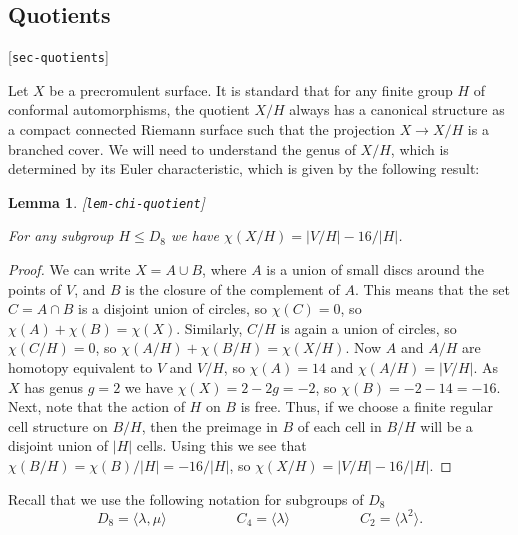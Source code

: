 \documentclass[reqno]{amsart}
\newcommand{\lbl}[1]{\label{#1}\textup{[\texttt{#1}]}\par}
\newcommand{\lbl}{\label}
\newcommand{\lm}        {\lambda}
\newcommand{\ip}[1]     {\langle #1\rangle}
\renewcommand{\:}{\colon}
\newtheorem{lemma}[theorem]{Lemma}
\theoremstyle{definition}
\begin{document}
\subsection{Quotients}
\lbl{sec-quotients}

Let $X$ be a precromulent surface.  It is standard that for any finite
group $H$ of conformal automorphisms, the quotient $X/H$ always has a
canonical structure as a compact connected Riemann surface such that
the projection $X\to X/H$ is a branched cover.  We will need to
understand the genus of $X/H$, which is determined by its Euler
characteristic, which is given by the following result:

\begin{lemma}\lbl{lem-chi-quotient}
 For any subgroup $H\leq D_8$ we have $\chi(X/H)=|V/H|-16/|H|$.
\end{lemma}
\begin{proof}
 We can write $X=A\cup B$, where $A$ is a union of small discs
 around the points of $V$, and $B$ is the closure of the complement of
 $A$.  This means that the set $C=A\cap B$ is a disjoint union of
 circles, so $\chi(C)=0$, so $\chi(A)+\chi(B)=\chi(X)$.  Similarly,
 $C/H$ is again a union of circles, so $\chi(C/H)=0$, so
 $\chi(A/H)+\chi(B/H)=\chi(X/H)$.  Now $A$ and $A/H$ are homotopy
 equivalent to $V$ and $V/H$, so $\chi(A)=14$ and $\chi(A/H)=|V/H|$.
 As $X$ has genus $g=2$ we have $\chi(X)=2-2g=-2$, so
 $\chi(B)=-2-14=-16$.  Next, note that the action of $H$ on $B$ is
 free.  Thus, if we choose a finite regular cell
 structure on $B/H$, then the preimage in $B$ of each cell in $B/H$
 will be a disjoint union of $|H|$ cells.  Using this we see that
 $\chi(B/H)=\chi(B)/|H|=-16/|H|$, so $\chi(X/H)=|V/H|-16/|H|$.
\end{proof}

Recall that we use the following notation for subgroups of $D_8$
\[
  D_8 = \ip{\lm,\mu} \hspace{5em}
  C_4 = \ip{\lm} \hspace{5em}
  C_2 = \ip{\lm^2}.
\]
\end{document}
